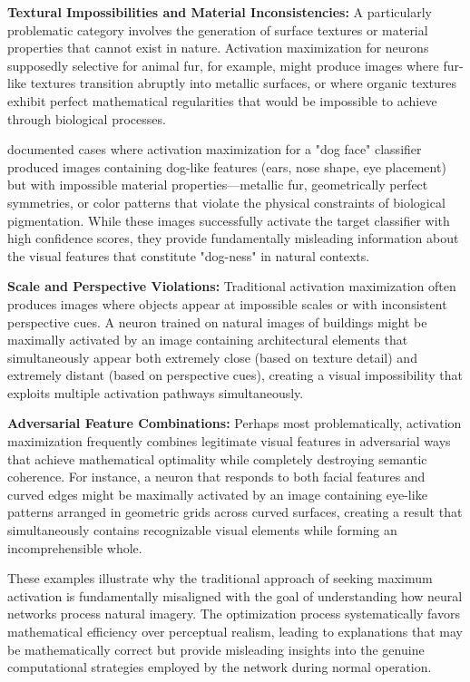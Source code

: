 \documentclass[licencjacka,en]{pracamgr}
\begin{document}
\textbf{Textural Impossibilities and Material Inconsistencies:} A particularly problematic category involves the generation of surface textures or material properties that cannot exist in nature. Activation maximization for neurons supposedly selective for animal fur, for example, might produce images where fur-like textures transition abruptly into metallic surfaces, or where organic textures exhibit perfect mathematical regularities that would be impossible to achieve through biological processes.

\citet{nguyen2016synthesizingpreferredinputsneurons} documented cases where activation maximization for a "dog face" classifier produced images containing dog-like features (ears, nose shape, eye placement) but with impossible material properties—metallic fur, geometrically perfect symmetries, or color patterns that violate the physical constraints of biological pigmentation. While these images successfully activate the target classifier with high confidence scores, they provide fundamentally misleading information about the visual features that constitute "dog-ness" in natural contexts.

\textbf{Scale and Perspective Violations:} Traditional activation maximization often produces images where objects appear at impossible scales or with inconsistent perspective cues. A neuron trained on natural images of buildings might be maximally activated by an image containing architectural elements that simultaneously appear both extremely close (based on texture detail) and extremely distant (based on perspective cues), creating a visual impossibility that exploits multiple activation pathways simultaneously.

\textbf{Adversarial Feature Combinations:} Perhaps most problematically, activation maximization frequently combines legitimate visual features in adversarial ways that achieve mathematical optimality while completely destroying semantic coherence. For instance, a neuron that responds to both facial features and curved edges might be maximally activated by an image containing eye-like patterns arranged in geometric grids across curved surfaces, creating a result that simultaneously contains recognizable visual elements while forming an incomprehensible whole.

These examples illustrate why the traditional approach of seeking maximum activation is fundamentally misaligned with the goal of understanding how neural networks process natural imagery. The optimization process systematically favors mathematical efficiency over perceptual realism, leading to explanations that may be mathematically correct but provide misleading insights into the genuine computational strategies employed by the network during normal operation.
\end{document}
